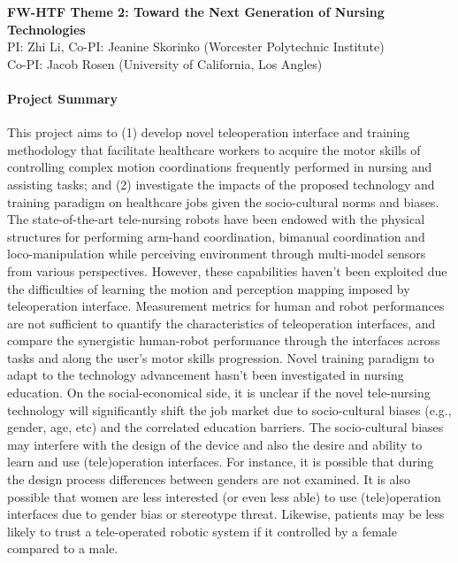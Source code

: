 \pagebreak

\begin{center}
	{\Large \bf FW-HTF Theme 2: \textbf{Toward the Next Generation of Nursing Technologies}}\\
    \vspace{4pt}
   	{\large PI: Zhi Li, Co-PI: Jeanine Skorinko (Worcester Polytechnic Institute)\\
    Co-PI: Jacob Rosen (University of California, Los Angles)}
\end{center}


\paragraph*{\Large Project Summary} 
This project aims to (1) develop novel teleoperation interface and training methodology that facilitate healthcare workers to acquire the motor skills of controlling complex motion coordinations frequently performed in nursing and assisting tasks; and (2) investigate the impacts of the proposed technology and training paradigm on healthcare jobs given the socio-cultural norms and biases. The state-of-the-art tele-nursing robots have been endowed with the physical structures for performing arm-hand coordination, bimanual coordination and loco-manipulation while perceiving environment through multi-model sensors from various perspectives. However, these capabilities haven't been exploited due the difficulties of learning the motion and perception mapping imposed by teleoperation interface. Measurement metrics for human and robot performances are not sufficient to quantify the characteristics of teleoperation interfaces, and compare the synergistic human-robot performance through the interfaces across tasks and along the user's motor skills progression. Novel training paradigm to adapt to the technology advancement hasn't been investigated in nursing education. On the social-economical side, it is unclear if the novel tele-nursing technology will significantly shift the job market due to socio-cultural biases (e.g., gender, age, etc) and the correlated education barriers. The socio-cultural biases may interfere with the design of the device and also the desire and ability to learn and use (tele)operation interfaces. For instance, it is possible that during the design process differences between genders are not examined. It is also possible that women are less interested (or even less able) to use (tele)operation interfaces due to gender bias or stereotype threat. Likewise, patients may be less likely to trust a tele-operated robotic system if it controlled by a female compared to a male.  

